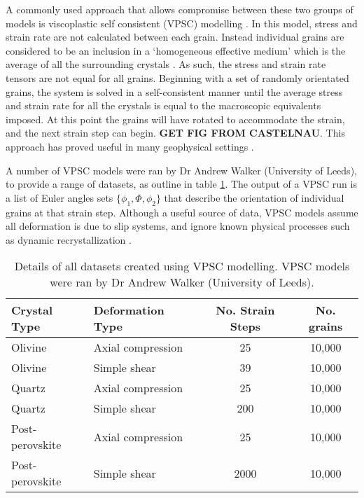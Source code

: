 \documentclass[a4paper,12pt,twoside]{report}
\numberwithin{equation}{chapter}
\begin{document}
A commonly used approach that allows compromise between these two groups of models is viscoplastic self consistent (VPSC) modelling \citep{Molinari1987,Lebensohn1993}. In this model, stress and strain rate are not calculated between each grain. Instead individual grains are considered to be an inclusion in a \lq{}homogeneous effective medium\rq{} which is the average of all the surrounding crystals \citep[i.e. nearest neighbour effects are not taken into account][]{Castelnau1996}. As such, the stress and strain rate tensors are not equal for all grains. Beginning with a set of randomly orientated grains, the system is solved in a self-consistent manner until the average stress and strain rate for all the crystals is equal to the macroscopic equivalents imposed. At this point the grains will have rotated to accommodate the strain, and the next strain step can begin. \textbf{GET FIG FROM CASTELNAU}. This approach has proved useful in many geophysical settings \citep[e.g.][]{Wenk1999}.

A number of VPSC models were ran by Dr Andrew Walker (University of Leeds), to provide a range of datasets, as outline in table \ref{tab:VPSC_data}. The output of a VPSC run is a list of Euler angles sets $\{\phi_1,\Phi,\phi_2\}$ that describe the orientation of individual grains at that strain step. Although a useful source of data, VPSC models assume all deformation is due to slip systems, and ignore known physical processes such as dynamic recrystallization \citep[see,][]{Tommasi2000}.      

\begin{table} 
	\centering
	\caption[VPSC datasets]{Details of all datasets created using VPSC modelling. VPSC models were ran by Dr Andrew Walker (University of Leeds).\\}
\begin{tabularx}{\textwidth}{X X c c}
	\hline
	\hline
	Crystal Type    & Deformation Type  & No. Strain Steps & No. grains \\
	\hline
	\hline
	Olivine         & Axial compression & 25   & 10,000 \\
	Olivine         & Simple shear      & 39   & 10,000 \\
	Quartz          & Axial compression & 25   & 10,000 \\
	Quartz          & Simple shear      & 200  & 10,000 \\
	Post-perovskite & Axial compression & 25   & 10,000 \\
	Post-perovskite & Simple shear      & 2000 & 10,000 \\
	\hline
	\end{tabularx}
\label{tab:VPSC_data}
\end{table}
\end{document}
